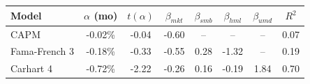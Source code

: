 \begin{tabular}{lccccccc}
\toprule
Model & $\alpha$ (mo) & $t(\alpha)$ & $\beta_{mkt}$ & $\beta_{smb}$ & $\beta_{hml}$ & $\beta_{umd}$ & $R^2$ \\
\midrule
CAPM & -0.02\% & -0.04 & -0.60 & -- & -- & -- & 0.07 \\
Fama-French 3 & -0.18\% & -0.33 & -0.55 & 0.28 & -1.32 & -- & 0.19 \\
Carhart 4 & -0.72\% & -2.22 & -0.26 & 0.16 & -0.19 & 1.84 & 0.70 \\
\bottomrule
\end{tabular}
